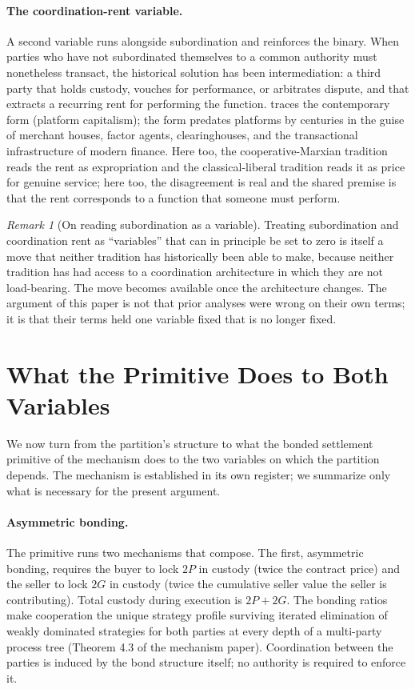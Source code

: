 \documentclass[11pt,a4paper]{article}
\theoremstyle{remark}
\newtheorem{remark}{Remark}[section]
\begin{document}
\paragraph{The coordination-rent variable.}
A second variable runs alongside subordination and reinforces the
binary. When parties who have not subordinated themselves to a
common authority must nonetheless transact, the historical
solution has been intermediation: a third party that holds
custody, vouches for performance, or arbitrates dispute, and that
extracts a recurring rent for performing the function.
\citet{srnicek2017platform} traces the contemporary form
(platform capitalism); the form predates platforms by centuries
in the guise of merchant houses, factor agents, clearinghouses,
and the transactional infrastructure of modern finance. Here too,
the cooperative-Marxian tradition reads the rent as expropriation
and the classical-liberal tradition reads it as price for genuine
service; here too, the disagreement is real and the shared
premise is that the rent corresponds to a function that someone
must perform.

\begin{remark}[On reading subordination as a variable]
Treating subordination and coordination rent as ``variables''
that can in principle be set to zero is itself a move that
neither tradition has historically been able to make, because
neither tradition has had access to a coordination architecture
in which they are not load-bearing. The move becomes available
once the architecture changes. The argument of this paper is not
that prior analyses were wrong on their own terms; it is that
their terms held one variable fixed that is no longer fixed.
\end{remark}

\section{What the Primitive Does to Both Variables}
\label{sec:what-primitive-does}

We now turn from the partition's structure to what the bonded
settlement primitive of the mechanism does to the
two variables on which the partition depends. The mechanism is
established in its own register; we summarize only what is
necessary for the present argument.

\paragraph{Asymmetric bonding.}
The primitive runs two mechanisms that compose. The first,
asymmetric bonding, requires the buyer to lock $2P$ in custody
(twice the contract price) and the seller to lock $2G$ in custody
(twice the cumulative seller value the seller is contributing).
Total custody during execution is $2P + 2G$. The bonding ratios
make cooperation the unique strategy profile surviving iterated
elimination of weakly dominated strategies for both parties at
every depth of a multi-party process tree
(Theorem 4.3 of the mechanism paper). Coordination
between the parties is induced by the bond structure itself; no
authority is required to enforce it.
\end{document}
